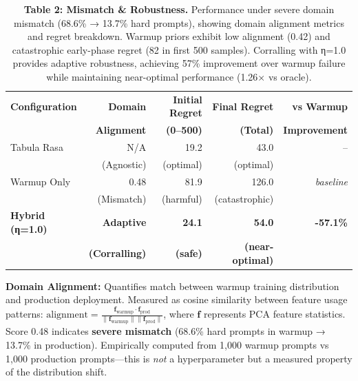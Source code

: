 
\begin{table}[t]
\caption{\textbf{Table 2: Mismatch \& Robustness.} Performance under severe domain mismatch (68.6\% → 13.7\% hard prompts), showing domain alignment metrics and regret breakdown. Warmup priors exhibit low alignment (0.42) and catastrophic early-phase regret (82 in first 500 samples). Corralling with η=1.0 provides adaptive robustness, achieving 57\% improvement over warmup failure while maintaining near-optimal performance (1.26× vs oracle).}
\label{tab:mismatch-robustness}
\centering
\small
\begin{tabular}{@{}lrrrr@{}}
\toprule
\textbf{Configuration} & \textbf{Domain} & \textbf{Initial Regret} & \textbf{Final Regret} & \textbf{vs Warmup} \\
 & \textbf{Alignment} & \textbf{(0--500)} & \textbf{(Total)} & \textbf{Improvement} \\
\midrule
Tabula Rasa & N/A & 19.2 & 43.0 & -- \\
 & (Agnostic) & (optimal) & (optimal) & \\
\midrule
Warmup Only & 0.48 & 81.9 & 126.0 & \textit{baseline} \\
 & (Mismatch) & (harmful) & (catastrophic) & \\
\midrule
\textbf{Hybrid (η=1.0)} & \textbf{Adaptive} & \textbf{24.1} & \textbf{54.0} & \textbf{-57.1\%} \\
 & \textbf{(Corralling)} & \textbf{(safe)} & \textbf{(near-optimal)} & \\
\bottomrule
\end{tabular}
\vspace{0.5em}

\begin{tablenotes}
\small
\item \textbf{Domain Alignment:} Quantifies match between warmup training distribution and production deployment. Measured as cosine similarity between feature usage patterns: $\text{alignment} = \frac{\mathbf{f}_{\text{warmup}} \cdot \mathbf{f}_{\text{prod}}}{\|\mathbf{f}_{\text{warmup}}\| \|\mathbf{f}_{\text{prod}}\|}$, where $\mathbf{f}$ represents PCA feature statistics. Score 0.48 indicates \textbf{severe mismatch} (68.6\% hard prompts in warmup → 13.7\% in production). Empirically computed from 1,000 warmup prompts vs 1,000 production prompts—this is \emph{not} a hyperparameter but a measured property of the distribution shift.


\end{tablenotes}
\end{table}

